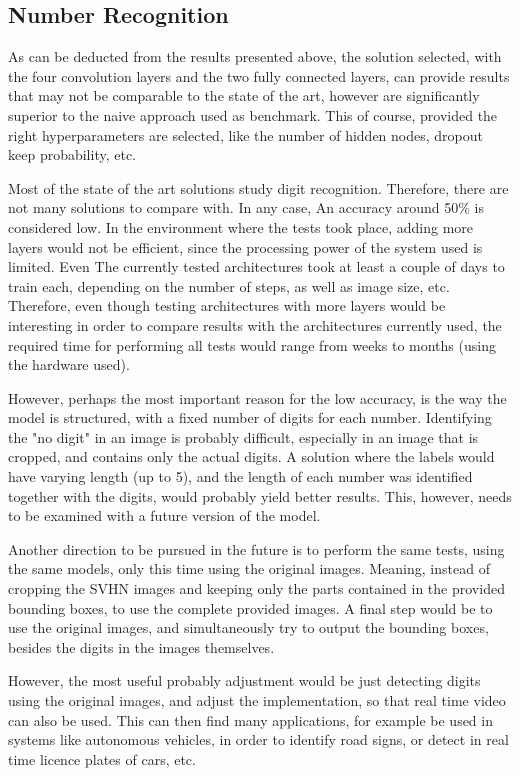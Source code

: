 \documentclass[final,12p,times]{elsarticle}
\begin{document}
\subsection{Number Recognition}
\label{sec:6.1}
As can be deducted from the results presented above, the solution selected, with the four convolution layers and the 
two fully connected layers, can provide results that may not be comparable to the state of the art, however are significantly 
superior to the naive approach used as benchmark.
This of course, provided the right hyperparameters are selected, like the number of hidden nodes, dropout keep probability, etc.

Most of the state of the art solutions study digit recognition.
Therefore, there are not many solutions to compare with.
In any case, An accuracy around 50\% is considered low.
In the environment where the tests took place, adding more layers would not be efficient, since the processing power of the system used is limited.
Even The currently tested architectures took at least a couple of days to train each, depending on the number of steps, as well as image size, etc.
Therefore, even though testing architectures with more layers would be interesting in order to compare results with the 
architectures currently used,  the required time for performing all tests would range from weeks to months 
(using the hardware used).

However, perhaps the most important reason for the low accuracy, is the way the model is structured, with a fixed number of 
digits for each number.
Identifying the "no digit" in an image is probably difficult, especially in an image that is cropped, and contains only the 
actual digits.
A solution where the labels would have varying length (up to 5), and the length of each number was identified together with 
the digits, would probably yield better results.
This, however, needs to be examined with a future version of the model.

Another direction to be pursued in the future is to perform the same tests, using the same models, only this time using the 
original images. Meaning, instead of cropping the SVHN images and keeping only the parts contained in the provided bounding boxes, 
to use the complete provided images.
A final step would be to use the original images, and simultaneously try to output the bounding boxes, besides the digits in the images 
themselves.

However, the most useful probably adjustment would be just detecting digits using the original images, and adjust the implementation, 
so that real time video can also be used.
This can then find many applications, for example be used in systems like autonomous vehicles, in order to identify road signs, 
or detect in real time licence plates of cars, etc.
\end{document}
